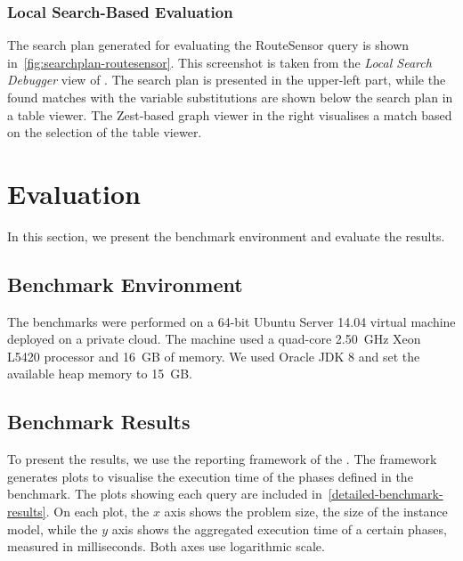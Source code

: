 \documentclass[submission,copyright,creativecommons]{eptcs}
\begin{document}
\subsubsection{Local Search-Based Evaluation}

The search plan generated for evaluating the \textsf{RouteSensor} query is shown in~\autoref{fig:searchplan-routesensor}. This screenshot is taken from the \emph{Local Search Debugger} view of \eiq. The search plan is presented in the upper-left part, while the found matches with the variable substitutions are shown below the search plan in a table viewer. The Zest-based graph viewer in the right visualises a match based on the selection of the table viewer.

\section{Evaluation}

In this section, we present the benchmark environment and evaluate the results. %

\subsection{Benchmark Environment}

The benchmarks were performed on a 64-bit Ubuntu Server 14.04 virtual machine deployed on a private cloud. The machine used a quad-core 2.50~GHz Xeon L5420 processor and 16~GB of memory. We used Oracle JDK 8 and set the available heap memory to 15~GB.

\subsection{Benchmark Results}
\label{benchmark-results}

To present the results, we use the reporting framework of the \tb. The framework generates plots to visualise the execution time of the phases defined in the benchmark. %
The plots showing each query are included in~\autoref{detailed-benchmark-results}. On each plot, the $x$ axis shows the problem size, \ie the size of the instance model, while the $y$ axis shows the aggregated execution time of a certain phases, measured in milliseconds. Both axes use logarithmic scale.
\end{document}
